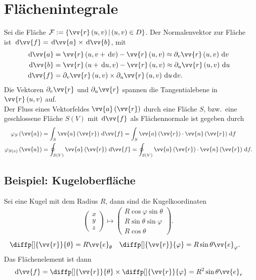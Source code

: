 \documentclass[a4paper,12pt]{article}
\newcommand{\td}{\,\text{d}}
\numberwithin{equation}{section}
\begin{document}
\section{Flächenintegrale}
Sei die Fläche $\mathcal{F}:=\left\{\vv{r}\left(u,v\right)|\left(u,v\right) \in D\right\}$. Der Normalenvektor zur Fläche ist $\td \vv{f}=\td \vv{a}\times \td \vv{b}$, mit
\begin{align} 
        \td \vv{a}&=\vv{r}\left(u,v+\td v\right)-\vv{r}\left(u,v\right)\approx \partial_v \vv{r}\left(u,v\right)\td v\\
        \td \vv{b}&=\vv{r}\left(u+\td u,v\right)-\vv{r}\left(u,v\right)\approx \partial_u \vv{r}\left(u,v\right)\td u\\
        \td \vv{f}&=\partial_v \vv{r}\left(u,v\right)\times \partial_u\vv{r}\left(u,v\right)\td u\td v
.\end{align} 
Die Vektoren $\partial_v \vv{r}$ und $\partial_u \vv{r}$ spannen die Tangentialebene in $\vv{r}\left(u,v\right)$ auf.\\\indent
Der Fluss eines Vektorfeldes $\vv{a}\left(\vv{r}\right)$ durch eine Fläche $S$, bzw.\ eine geschlossene Fläche $S\left(V\right)$ mit $\td \vv{f}$ als Flächennormale ist gegeben durch
\begin{align} 
        \varphi _S\left(\vv{a}\right)&=\int_{S}^{}\vv{a}\left(\vv{r}\right)\td \vv{f}=\int_{S}^{}\vv{a}\left(\vv{r}\right)\cdot \vv{n}\left(\vv{r}\right)\td f\\
        \varphi _{S\left(v\right)}\left(\vv{a}\right)&=\oint_{S\left(V\right)}^{}\vv{a}\left(\vv{r}\right)\td \vv{f}=\oint_{S\left(V\right)}^{}\vv{a}\left(\vv{r}\right)\cdot \vv{n}\left(\vv{r}\right)\td f
.\end{align} 


\subsection{Beispiel: Kugeloberfläche}
Sei eine Kugel mit dem Radius $R$, dann sind die Kugelkoordinaten
\begin{align} 
        \begin{pmatrix}
                x\\y\\z
        \end{pmatrix}\mapsto \begin{pmatrix}
                R\cos \varphi \sin \theta \\R\sin \theta \sin \varphi \\R\cos \theta 
        \end{pmatrix}
.\end{align} 
\begin{align} 
        \diffp[]{\vv{r}}{\theta }&=R\vv{e}_\theta &\diffp[]{\vv{r}}{\varphi }&=R\sin \theta \vv{e}_\varphi 
.\end{align} 
Das Flächenelement ist dann
\begin{align} 
        \td \vv{f}=\diffp[]{\vv{r}}{\theta }\times \diffp[]{\vv{r}}{\varphi }=R^2\sin \theta \vv{e}_r
\end{align} 

\end{document}

